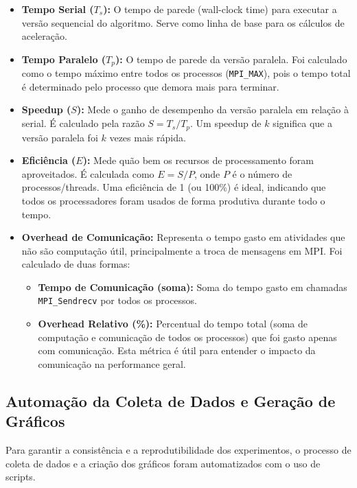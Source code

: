 \documentclass[12pt, a4paper]{article}
\begin{document}
\begin{itemize}
    \item \textbf{Tempo Serial ($T_s$):} O tempo de parede (wall-clock time) para executar a versão sequencial do algoritmo. Serve como linha de base para os cálculos de aceleração.
    
    \item \textbf{Tempo Paralelo ($T_p$):} O tempo de parede da versão paralela. Foi calculado como o tempo máximo entre todos os processos (\texttt{MPI\_MAX}), pois o tempo total é determinado pelo processo que demora mais para terminar.
    
    \item \textbf{Speedup ($S$):} Mede o ganho de desempenho da versão paralela em relação à serial. É calculado pela razão $S = T_s / T_p$. Um speedup de $k$ significa que a versão paralela foi $k$ vezes mais rápida.
    
    \item \textbf{Eficiência ($E$):} Mede quão bem os recursos de processamento foram aproveitados. É calculada como $E = S / P$, onde $P$ é o número de processos/threads. Uma eficiência de 1 (ou 100\%) é ideal, indicando que todos os processadores foram usados de forma produtiva durante todo o tempo.
    
    \item \textbf{Overhead de Comunicação:} Representa o tempo gasto em atividades que não são computação útil, principalmente a troca de mensagens em MPI. Foi calculado de duas formas:
    \begin{itemize}
        \item \textbf{Tempo de Comunicação (soma):} Soma do tempo gasto em chamadas \texttt{MPI\_Sendrecv} por todos os processos.
        \item \textbf{Overhead Relativo (\%):} Percentual do tempo total (soma de computação e comunicação de todos os processos) que foi gasto apenas com comunicação. Esta métrica é útil para entender o impacto da comunicação na performance geral.
    \end{itemize}
\end{itemize}


\subsection{Automação da Coleta de Dados e Geração de Gráficos}
Para garantir a consistência e a reprodutibilidade dos experimentos, o processo de coleta de dados e a criação dos gráficos foram automatizados com o uso de scripts.
\end{document}
